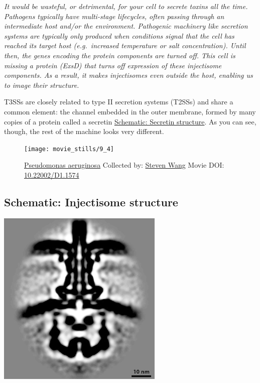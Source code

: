 \documentclass[]{tufte-book}
\begin{document}
\emph{It would be wasteful, or detrimental, for your cell to secrete
toxins all the time. Pathogens typically have multi-stage lifecycles,
often passing through an intermediate host and/or the environment.
Pathogenic machinery like secretion systems are typically only produced
when conditions signal that the cell has reached its target host
(e.g.~increased temperature or salt concentration). Until then, the
genes encoding the protein components are turned off. This cell is
missing a protein (ExsD) that turns off expression of these injectisome
components. As a result, it makes injectisomes even outside the host,
enabling us to image their structure.}

T3SSs are closely related to type II secretion systems (T2SSs) and share
a common element: the channel embedded in the outer membrane, formed by
many copies of a protein called a secretin
\protect\hyperlink{Secretin_structure}{Schematic: Secretin structure}.
As you can see, though, the rest of the machine looks very different.





\begin{figure}
\texttt{[image: movie\_stills/9\_4]} \caption[\protect\hyperlink{tree}{Pseudomonas aeruginosa} Collected by:
\protect\hyperlink{steven_wang}{Steven Wang} Movie DOI:
\href{https://doi.org/10.22002/D1.1574}{10.22002/D1.1574}]{\protect\hyperlink{tree}{Pseudomonas aeruginosa} Collected by:
\protect\hyperlink{steven_wang}{Steven Wang} Movie DOI:
\href{https://doi.org/10.22002/D1.1574}{10.22002/D1.1574}}\label{fig:9-4}
\end{figure}

\hypertarget{Injectisome_structure}{\subsection*{Schematic: Injectisome
structure}\label{Injectisome_structure}}

\includegraphics{img/schematics/9_4_1}
\end{document}
